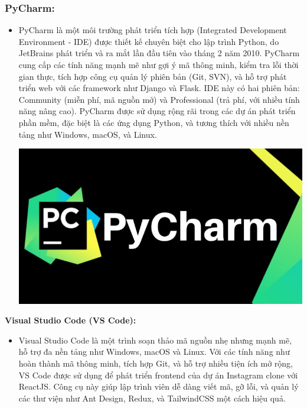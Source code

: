 \subsubsection{PyCharm:}
\begin{itemize}
    \item PyCharm là một môi trường phát triển tích hợp (Integrated Development Environment - IDE) được thiết kế chuyên biệt cho lập trình Python, do JetBrains phát triển và ra mắt lần đầu tiên vào tháng 2 năm 2010. PyCharm cung cấp các tính năng mạnh mẽ như gợi ý mã thông minh, kiểm tra lỗi thời gian thực, tích hợp công cụ quản lý phiên bản (Git, SVN), và hỗ trợ phát triển web với các framework như Django và Flask. IDE này có hai phiên bản: Community (miễn phí, mã nguồn mở) và Professional (trả phí, với nhiều tính năng nâng cao). PyCharm được sử dụng rộng rãi trong các dự án phát triển phần mềm, đặc biệt là các ứng dụng Python, và tương thích với nhiều nền tảng như Windows, macOS, và Linux.
    
    \includegraphics[width=\textwidth]{imgs/pycharm.png}
\end{itemize}

{\normalsize \textbf{Visual Studio Code (VS Code):}}
\begin{itemize}
\item Visual Studio Code là một trình soạn thảo mã nguồn nhẹ nhưng mạnh mẽ, hỗ trợ đa nền tảng như Windows, macOS và Linux. Với các tính năng như hoàn thành mã thông minh, tích hợp Git, và hỗ trợ nhiều tiện ích mở rộng, VS Code được sử dụng để phát triển frontend của dự án Instagram clone với ReactJS. Công cụ này giúp lập trình viên dễ dàng viết mã, gỡ lỗi, và quản lý các thư viện như Ant Design, Redux, và TailwindCSS một cách hiệu quả.
\end{itemize}

